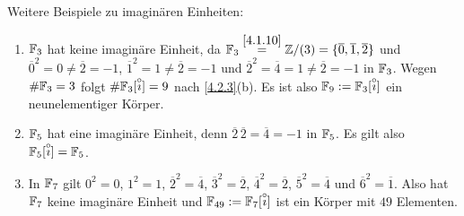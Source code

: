 \documentclass[../../main.tex]{subfiles}
\begin{document}
\begin{bsp}\label{4.2.14} Weitere Beispiele zu imaginären Einheiten:
\begin{enumerate}[\normalfont(a)]
\item $\mathbb F_3$ hat keine imaginäre Einheit, da $\mathbb F_3\overset{\ref{4.1.10}}=\mathbb Z/(3)=\{\overline0,\overline1,\overline2\}$ und $\overline0^2=0\ne\overline2=-1$,
$\overline1^2=1\ne\overline2=-1$ und $\overline2^2=\overline4=1\ne\overline2=-1$ in $\mathbb F_3$. Wegen $\#\mathbb F_3=3$ folgt $\#\mathbb F_3[\overset\circ\imath]=9$ nach \ref{4.2.3}(b). Es ist also $\mathbb F_9:=\mathbb F_3[\overset\circ\imath]$ ein 
neunelementiger Körper.
\item $\mathbb F_5$ hat eine imaginäre Einheit, denn $\overline2\,\overline2=\overline4=-1$ in $\mathbb F_5$. Es gilt also $\mathbb F_5[\overset\circ\imath]=\mathbb F_5$.
\item In $\mathbb F_7$ gilt $0^2=0$, $1^2=1$, $\overline2^2=\overline4$, $\overline3^2=\overline2$, $\overline4^2=\overline2$, $\overline5^2=\overline 4$ und $\overline6^2=\overline1$. Also hat $\mathbb F_7$ keine imaginäre Einheit und $\mathbb F_{49}:=\mathbb F_7[\overset\circ\imath]$ ist ein Körper mit $49$ Elementen.
\end{enumerate}
\end{bsp}
\end{document}
